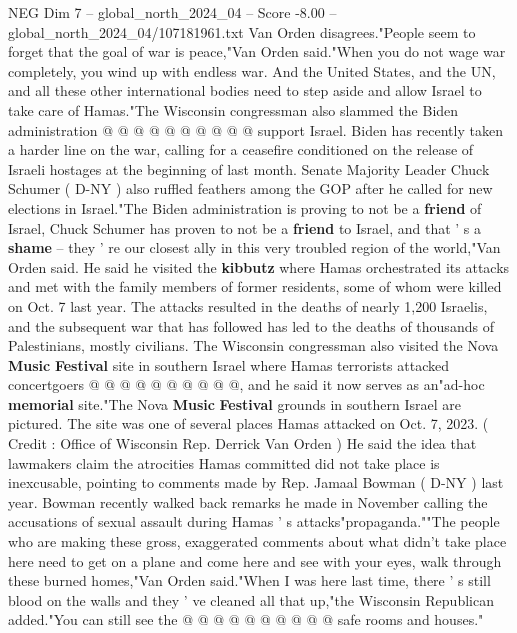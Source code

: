 \begin{textsample}{NEG Dim 7 – global\_north\_2024\_04 – Score -8.00 – global\_north\_2024\_04/107181961.txt}
Van Orden disagrees."People seem to forget that the goal of war is peace,"Van Orden said."When you do not wage war completely, you wind up with endless war.
And the United States, and the UN, and all these other international bodies need to step aside and allow Israel to take care of Hamas."The Wisconsin congressman also slammed the Biden administration @ @ @ @ @ @ @ @ @ @ support Israel.
Biden has recently taken a harder line on the war, calling for a ceasefire conditioned on the release of Israeli hostages at the beginning of last month.
Senate Majority Leader Chuck Schumer ( D-NY ) also ruffled feathers among the GOP after he called for new elections in Israel."The Biden administration is proving to not be a \textbf{friend} of Israel, Chuck Schumer has proven to not be a \textbf{friend} to Israel, and that ' s a \textbf{shame} -- they ' re our closest ally in this very troubled region of the world,"Van Orden said.
He said he visited the \textbf{kibbutz} where Hamas orchestrated its attacks and met with the family members of former residents, some of whom were killed on Oct. 7 last year.
The attacks resulted in the deaths of nearly 1,200 Israelis, and the subsequent war that has followed has led to the deaths of thousands of Palestinians, mostly civilians.
The Wisconsin congressman also visited the Nova \textbf{Music} \textbf{Festival} site in southern Israel where Hamas terrorists attacked concertgoers @ @ @ @ @ @ @ @ @ @, and he said it now serves as an"ad-hoc \textbf{memorial} site."The Nova \textbf{Music} \textbf{Festival} grounds in southern Israel are pictured.
The site was one of several places Hamas attacked on Oct. 7, 2023. ( Credit : Office of Wisconsin Rep.
Derrick Van Orden ) He said the idea that lawmakers claim the atrocities Hamas committed did not take place is inexcusable, pointing to comments made by Rep.
Jamaal Bowman ( D-NY ) last year.
Bowman recently walked back remarks he made in November calling the accusations of sexual assault during Hamas ' s attacks"propaganda.""The people who are making these gross, exaggerated comments about what didn't take place here need to get on a plane and come here and see with your eyes, walk through these burned homes,"Van Orden said."When I was here last time, there ' s still blood on the walls and they ' ve cleaned all that up,"the Wisconsin Republican added."You can still see the @ @ @ @ @ @ @ @ @ @ safe rooms and houses."

\end{textsample}
